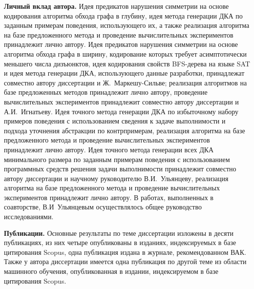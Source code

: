 \textbf{Личный вклад автора.}
Идея предикатов нарушения симметрии на основе кодирования алгоритма обхода графа в глубину, идея метода генерации ДКА по заданным примерам поведения, использующего их, а также реализация алгоритма на базе предложенного метода и проведение вычислительных экспериментов принадлежит лично автору.
Идея предикатов нарушения симметрии на основе алгоритма обхода графа в ширину, кодирование которых требует асимптотически меньшего числа дизъюнктов, идея кодирования свойств BFS-дерева на языке SAT и идея метода генерации ДКА, использующего данные разработки, принадлежат совместно автору диссертации и Ж.~Маркешу-Сильве; реализация алгоритмов на базе предложенных методов принадлежит лично автору, проведение вычислительных экспериментов принадлежит совместно автору диссертации и А.И.~Игнатьеву.
Идея точного метода генерации ДКА по избыточному набору примеров поведения с использованием сведения к задаче выполнимости и подхода уточнения абстракции по контрпримерам, реализация алгоритма на базе предложенного метода и проведение вычислительных экспериментов принадлежит лично автору.
Идея точного метода генерации всех ДКА минимального размера по заданным примерам поведения с использованием программных средств решения задачи выполнимости принадлежит совместно автору диссертации и научному руководителю В.И.~Ульянцеву, реализация алгоритма на базе предложенного метода и проведение вычислительных экспериментов принадлежит лично автору.
В работах, выполненных в соавторстве, В.И~Ульянцевым осуществлялось общее руководство исследованиями.

\textbf{Публикации.}
Основные результаты по теме диссертации изложены в десяти публикациях, из них четыре опубликованы в изданиях, индексируемых в базе цитирования Scopus, одна публикация издана в журнале, рекомендованном ВАК.
Также у автора диссертации имеется одна публикация по другой теме из области машинного обучения, опубликованная в издании, индексируемом в базе цитирования Scopus.